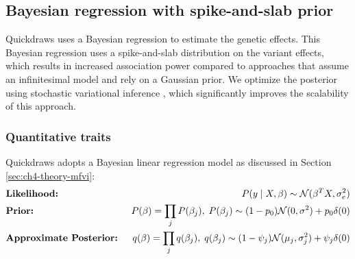 \subsection{Bayesian regression with spike-and-slab prior }
\label{sec:ch4-blr}
%
Quickdraws uses a Bayesian regression to estimate the genetic effects.
%
This Bayesian regression uses a spike-and-slab distribution on the variant effects, which results in increased association power compared to approaches that assume an infinitesimal model and rely on a Gaussian prior.
%
We optimize the posterior using stochastic variational inference \cite{hoffman2013stochastic}, which significantly improves the scalability of this approach.
%

\subsubsection{Quantitative traits}

Quickdraws adopts a Bayesian linear regression model as discussed in Section \ref{sec:ch4-theory-mfvi}:
\begin{align}
    &\text{\textbf{Likelihood:} } &P(y \mid X, \beta) \sim \mathcal{N}(\beta^T X, \sigma_e^2) \nonumber \\
    &\text{\textbf{Prior:} } &P(\beta) = \prod_j P(\beta_j), \hspace{1mm} P(\beta_j) \sim (1-p_0)\mathcal{N} (0, \sigma ^ 2) + p_0 \delta(0) \nonumber \\
    &\text{\textbf{Approximate Posterior:} } &q(\beta) = \prod_j q(\beta_j), \hspace{1mm} q(\beta_j) \sim (1-\psi_j)\mathcal{N}(\mu_j, \sigma^2_j) + \psi_j \delta(0) \label{spike-and-slab-model2}
\end{align}

